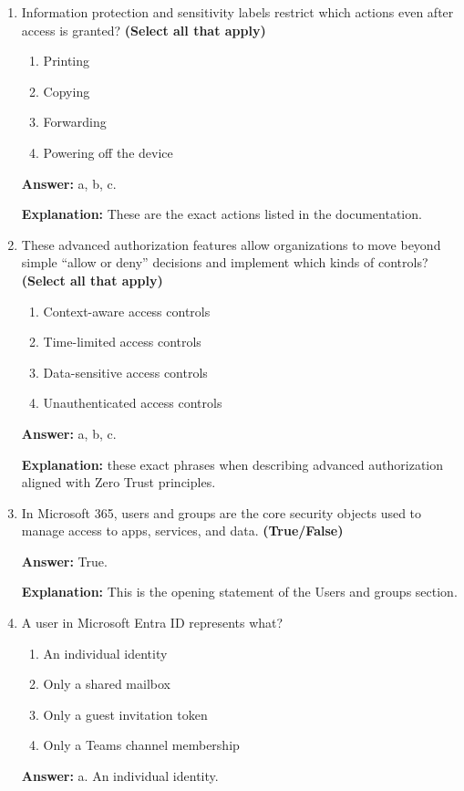 \documentclass[10pt]{article}
\begin{document}
\begin{enumerate}[leftmargin=*]
\textbf{Explanation:} Access Packages are useful for onboarding employees or external collaborators needing timed access.

\item Information protection and sensitivity labels restrict which actions even after access is granted? \textbf{(Select all that apply)}
\begin{enumerate}[label=\alph*., leftmargin=1.5em]
\item Printing
\item Copying
\item Forwarding
\item Powering off the device
\end{enumerate}
\textbf{Answer:} a, b, c.

\textbf{Explanation:} These are the exact actions listed in the documentation.

\item These advanced authorization features allow organizations to move beyond simple ``allow or deny'' decisions and implement which kinds of controls? \textbf{(Select all that apply)}
\begin{enumerate}[label=\alph*., leftmargin=1.5em]
\item Context-aware access controls
\item Time-limited access controls
\item Data-sensitive access controls
\item Unauthenticated access controls
\end{enumerate}
\textbf{Answer:} a, b, c.

\textbf{Explanation:} these exact phrases when describing advanced authorization aligned with Zero Trust principles.

\item In Microsoft 365, users and groups are the core security objects used to manage access to apps, services, and data. \textbf{(True/False)}

\textbf{Answer:} True.

\textbf{Explanation:} This is the opening statement of the Users and groups section.

\item A user in Microsoft Entra ID represents what?
\begin{enumerate}[label=\alph*., leftmargin=1.5em]
\item An individual identity
\item Only a shared mailbox
\item Only a guest invitation token
\item Only a Teams channel membership
\end{enumerate}
\textbf{Answer:} a. An individual identity.


\end{enumerate}
\end{document}
